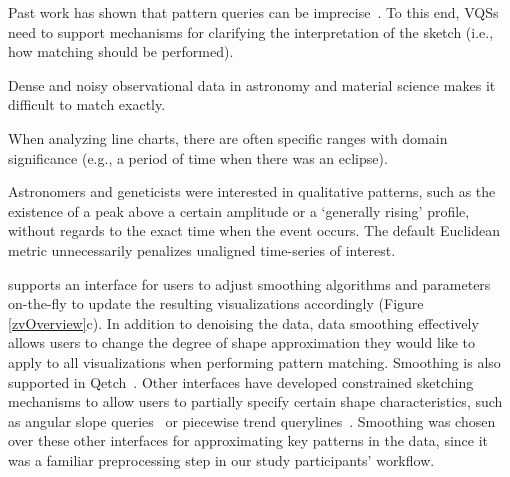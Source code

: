  Past work has shown that pattern queries can be imprecise~\cite{correll2016semantics,Holz2009,Eichmann2015}. To this end, VQSs need to support mechanisms for clarifying the interpretation of the sketch (i.e., how matching should be performed).
\problemlist
  \item Dense and noisy observational data in astronomy and material science makes it difficult to match exactly.
  \item When analyzing line charts, there are often specific ranges with domain significance (e.g., a period of time when there was an eclipse).
  \item Astronomers and geneticists were interested in qualitative patterns, such as the existence of a peak above a certain amplitude or a `generally rising' profile, without regards to the exact time when the event occurs. The default Euclidean metric unnecessarily penalizes unaligned time-series of interest.
\enumend
\featurelist
\item \zvpp supports an interface for users to adjust smoothing algorithms and parameters on-the-fly to update the resulting visualizations accordingly (Figure \ref{zvOverview}c). In addition to denoising the data, data smoothing effectively allows users to change the degree of shape approximation they would like to apply to all visualizations when performing pattern matching. Smoothing is also supported in Qetch~\cite{Mannino2018}. Other interfaces have developed constrained
sketching mechanisms to allow users to partially specify certain shape characteristics, such as angular slope queries~\cite{Hochheiser2004} or piecewise trend querylines~\cite{ryall2005querylines}. Smoothing was chosen over these other interfaces for approximating key patterns in the data, since it was a familiar preprocessing step in our study participants' workflow.
